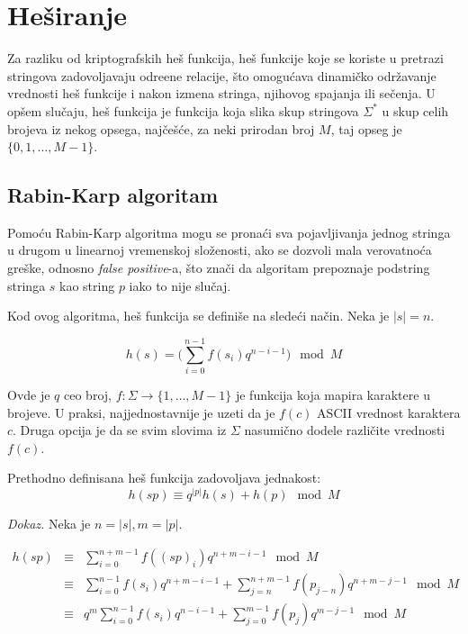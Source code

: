\section{He\v siranje}

Za razliku od kriptografskih he\v s funkcija, he\v s funkcije koje se koriste u pretrazi stringova zadovoljavaju odre\dj ene relacije, \v sto omogu\' cava dinami\v cko odr\v zavanje vrednosti he\v s funkcije i nakon izmena stringa, njihovog spajanja ili se\v cenja. U op\v sem slu\v caju, he\v s funkcija je funkcija koja slika skup stringova $\Sigma^*$ u skup celih brojeva iz nekog opsega, naj\v ce\v s\' ce, za neki prirodan broj $M$, taj opseg je $\{0, 1, \ldots, M-1\}$.

\subsection{Rabin-Karp algoritam}

Pomo\' cu Rabin-Karp algoritma mogu se prona\' ci sva pojavljivanja jednog stringa u drugom u linearnoj vremenskoj slo\v zenosti, ako se dozvoli mala verovatno\' ca gre\v ske, odnosno \textit{false positive}-a, \v sto zna\v ci da algoritam prepoznaje podstring stringa $s$ kao string $p$ iako to nije slu\v caj.

Kod ovog algoritma, he\v s funkcija se defini\v se na slede\' ci na\v cin. Neka je $|s| = n$.

\begin{equation}
    h(s) = \Big(\sum_{i=0}^{n-1} f(s_i)q^{n-i-1}\Big) \mod M
\end{equation}

Ovde je $q$ ceo broj, $f : \Sigma \rightarrow \{1, \ldots, M-1\}$ je funkcija koja mapira karaktere u brojeve. U praksi, najjednostavnije je uzeti da je $f(c)$ ASCII vrednost karaktera $c$. Druga opcija je da se svim slovima iz $\Sigma$ nasumi\v cno dodele razli\v cite vrednosti $f(c)$.

\begin{thm}
Prethodno definisana he\v s funkcija zadovoljava jednakost:
\begin{equation}
\label{hashjednacina}
    h(sp) \equiv q^{|p|}h(s)+h(p) \mod M
\end{equation}
\end{thm}

\textit{Dokaz.} Neka je $n = |s|, m = |p|$.

\begin{align*}
     h(sp) & \equiv & \sum_{i=0}^{n+m-1} f((sp)_i)q^{n+m-i-1} \mod M \\
           & \equiv & \sum_{i=0}^{n-1} f(s_i)q^{n+m-i-1} + \sum_{j=n}^{n+m-1} f(p_{j-n})q^{n+m-j-1} \mod M \\
           & \equiv & q^m \sum_{i=0}^{n-1} f(s_i)q^{n-i-1} + \sum_{j=0}^{m-1} f(p_{j})q^{m-j-1} \mod M \\
\end{align*}

